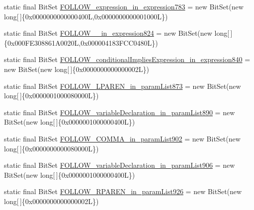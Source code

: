 \begin{DoxyCompactItemize}
static final Bit\-Set \hyperlink{classorg_1_1tzi_1_1use_1_1parser_1_1testsuite_1_1_test_suite_parser_a90bbe155bfd886f9e74b62d75f8b3291}{F\-O\-L\-L\-O\-W\-\_\-expression\-\_\-in\-\_\-expression783} = new Bit\-Set(new long\mbox{[}$\,$\mbox{]}\{0x0000000000000400\-L,0x0000000000001000\-L\})
\item 
static final Bit\-Set \hyperlink{classorg_1_1tzi_1_1use_1_1parser_1_1testsuite_1_1_test_suite_parser_af2bc53c81a17cc1e562c3236a80be3ac}{F\-O\-L\-L\-O\-W\-\_\-\_\-in\-\_\-expression824} = new Bit\-Set(new long\mbox{[}$\,$\mbox{]}\{0x000\-F\-E308861\-A0020\-L,0x000004183\-F\-C\-C0480\-L\})
\item 
static final Bit\-Set \hyperlink{classorg_1_1tzi_1_1use_1_1parser_1_1testsuite_1_1_test_suite_parser_af792f2c961219088b0e9c8839f6b5260}{F\-O\-L\-L\-O\-W\-\_\-conditional\-Implies\-Expression\-\_\-in\-\_\-expression840} = new Bit\-Set(new long\mbox{[}$\,$\mbox{]}\{0x0000000000000002\-L\})
\item 
static final Bit\-Set \hyperlink{classorg_1_1tzi_1_1use_1_1parser_1_1testsuite_1_1_test_suite_parser_acaef91aba7a21a77bbdc1c930d94f463}{F\-O\-L\-L\-O\-W\-\_\-\-L\-P\-A\-R\-E\-N\-\_\-in\-\_\-param\-List873} = new Bit\-Set(new long\mbox{[}$\,$\mbox{]}\{0x0000001000080000\-L\})
\item 
static final Bit\-Set \hyperlink{classorg_1_1tzi_1_1use_1_1parser_1_1testsuite_1_1_test_suite_parser_afa490a113c8c9ac9c5c27d2a724aec4b}{F\-O\-L\-L\-O\-W\-\_\-variable\-Declaration\-\_\-in\-\_\-param\-List890} = new Bit\-Set(new long\mbox{[}$\,$\mbox{]}\{0x0000001000000400\-L\})
\item 
static final Bit\-Set \hyperlink{classorg_1_1tzi_1_1use_1_1parser_1_1testsuite_1_1_test_suite_parser_a62fa1a9a59f7857b91ff88b1b5f8de80}{F\-O\-L\-L\-O\-W\-\_\-\-C\-O\-M\-M\-A\-\_\-in\-\_\-param\-List902} = new Bit\-Set(new long\mbox{[}$\,$\mbox{]}\{0x0000000000080000\-L\})
\item 
static final Bit\-Set \hyperlink{classorg_1_1tzi_1_1use_1_1parser_1_1testsuite_1_1_test_suite_parser_aec2850451ee7a76ca04d4110f5151c51}{F\-O\-L\-L\-O\-W\-\_\-variable\-Declaration\-\_\-in\-\_\-param\-List906} = new Bit\-Set(new long\mbox{[}$\,$\mbox{]}\{0x0000001000000400\-L\})
\item 
static final Bit\-Set \hyperlink{classorg_1_1tzi_1_1use_1_1parser_1_1testsuite_1_1_test_suite_parser_a4bdf8d6ccd5d7232f89f6c40b6e07646}{F\-O\-L\-L\-O\-W\-\_\-\-R\-P\-A\-R\-E\-N\-\_\-in\-\_\-param\-List926} = new Bit\-Set(new long\mbox{[}$\,$\mbox{]}\{0x0000000000000002\-L\})
\item 

\end{DoxyCompactItemize}
